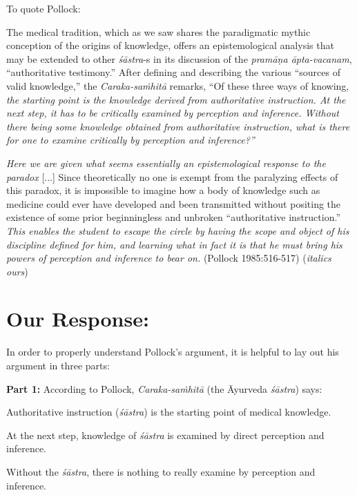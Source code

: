 To quote Pollock:
\begin{myquote}
The medical tradition, which as we saw shares the paradigmatic mythic conception of the origins of knowledge, offers an epistemological analysis that may be extended to other {\sl śāstra}-s in its discussion of the {\sl pra\-māṇa āpta-vacanam}, ``authoritative testimony.''  After defining and describing the various ``sources of valid knowledge,'' the {\sl Caraka-saṁhitā} remarks, ``Of these three ways of knowing, {\sl the starting point is the knowledge derived from authoritative instruction. At the next step, it has to be critically examined by perception and inference. Without there being some knowledge obtained from authoritative instruction, what is there for one to examine critically by perception and inference?''}

{{\sl Here we are given what seems essentially an epistemological response to the paradox}} [...] Since theoretically no one is exempt from the paralyzing effects of this paradox, it is impossible to imagine how a body of knowledge such as medicine could ever have developed and been transmitted without positing the existence of some prior beginningless and unbroken ``authoritative instruction.'' {\sl This enables the student to escape the circle by having the scope and object of his discipline defined for him, and learning what in fact it is that he must bring his powers of perception and inference to bear on.}
\hfill (Pollock 1985:516-517) ({\sl italics ours})
\end{myquote}

\section*{Our Response:}

In order to properly understand Pollock's argument, it is helpful to lay out his argument in three parts:

{\bf Part 1:}
According to Pollock, {\sl Caraka-saṁhitā} (the Āyurveda {\sl śāstra}) says:
\begin{myquote}
Authoritative instruction ({\sl śāstra}) is the starting point of medical knowledge. 

At the next step, knowledge of {\sl śāstra} is examined by direct perception and inference.

Without the {\sl śāstra}, there is nothing to really examine by perception and inference.  
\end{myquote}

